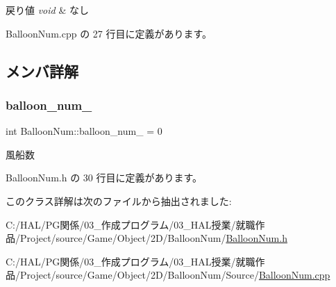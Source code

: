 \begin{DoxyRetVals}{戻り値}
{\em void} & なし \\
\hline
\end{DoxyRetVals}


 Balloon\+Num.\+cpp の 27 行目に定義があります。



\subsection{メンバ詳解}
\mbox{\label{class_balloon_num_a434ddee36deb6d0a364b890efc36c619}} 
\subsubsection{\texorpdfstring{balloon\+\_\+num\+\_\+}{balloon\_num\_}}
{\footnotesize\ttfamily int Balloon\+Num\+::balloon\+\_\+num\+\_\+ = 0\hspace{0.3cm}{\ttfamily [private]}}



風船数 



 Balloon\+Num.\+h の 30 行目に定義があります。



このクラス詳解は次のファイルから抽出されました\+:\begin{DoxyCompactItemize}
\item 
C\+:/\+H\+A\+L/\+P\+G関係/03\+\_\+作成プログラム/03\+\_\+\+H\+A\+L授業/就職作品/\+Project/source/\+Game/\+Object/2\+D/\+Balloon\+Num/\mbox{\hyperlink{_balloon_num_8h}{Balloon\+Num.\+h}}\item 
C\+:/\+H\+A\+L/\+P\+G関係/03\+\_\+作成プログラム/03\+\_\+\+H\+A\+L授業/就職作品/\+Project/source/\+Game/\+Object/2\+D/\+Balloon\+Num/\+Source/\mbox{\hyperlink{_balloon_num_8cpp}{Balloon\+Num.\+cpp}}\end{DoxyCompactItemize}
